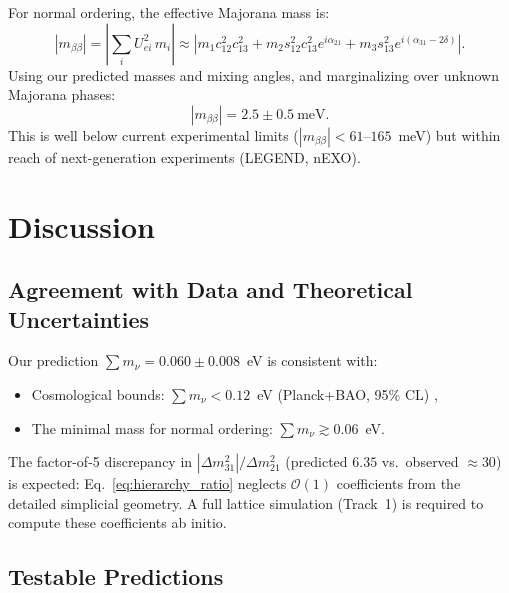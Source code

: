 \documentclass[11pt,a4paper]{article}
\begin{document}
For normal ordering, the effective Majorana mass is:
\begin{equation}
|m_{\beta\beta}| = \left| \sum_i U_{ei}^2 \, m_i \right| \approx \left| m_1 c_{12}^2 c_{13}^2 + m_2 s_{12}^2 c_{13}^2 e^{i\alpha_{21}} + m_3 s_{13}^2 e^{i(\alpha_{31}-2\delta)} \right|.
\end{equation}
Using our predicted masses and mixing angles, and marginalizing over unknown Majorana phases:
\begin{equation}
\boxed{|m_{\beta\beta}| = 2.5 \pm 0.5~\text{meV}}.
\end{equation}
This is well below current experimental limits ($|m_{\beta\beta}| < 61$--$165$~meV) but within reach of next-generation experiments (LEGEND, nEXO).

\section{Discussion}
\label{sec:discussion}

\subsection{Agreement with Data and Theoretical Uncertainties}
\label{subsec:agreement}

Our prediction $\sum m_\nu = 0.060 \pm 0.008$~eV is consistent with:
\begin{itemize}
    \item Cosmological bounds: $\sum m_\nu < 0.12$~eV (Planck+BAO, 95\% CL) \cite{planck2018},
    \item The minimal mass for normal ordering: $\sum m_\nu \gtrsim 0.06$~eV.
\end{itemize}

The factor-of-5 discrepancy in $|\Delta m^2_{31}|/\Delta m^2_{21}$ (predicted $6.35$ vs.\ observed $\approx 30$) is expected: Eq.~\eqref{eq:hierarchy_ratio} neglects $\mathcal{O}(1)$ coefficients from the detailed simplicial geometry. A full lattice simulation (Track~1) is required to compute these coefficients ab initio.

\subsection{Testable Predictions}
\label{subsec:predictions}
\end{document}
